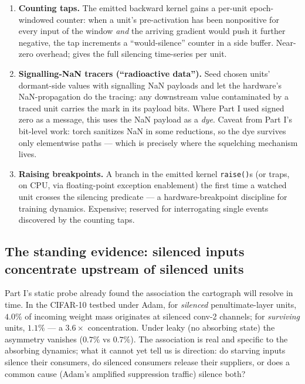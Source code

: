 \documentclass[11pt]{article}
\begin{document}
\begin{enumerate}
\item \textbf{Counting taps.} The emitted backward kernel gains a
per-unit epoch-windowed counter: when a unit's pre-activation has
been nonpositive for every input of the window \emph{and} the
arriving gradient would push it further negative, the tap increments
a ``would-silence'' counter in a side buffer. Near-zero overhead;
gives the full silencing time-series per unit.
\item \textbf{Signalling-NaN tracers (``radioactive data'').} Seed
chosen units' dormant-side values with signalling NaN payloads and
let the hardware's NaN-propagation do the tracing: any downstream
value contaminated by a traced unit carries the mark in its payload
bits. Where Part I used signed zero as a message, this uses the
NaN payload as a \emph{dye}. Caveat from Part I's bit-level work:
torch sanitizes NaN in some reductions, so the dye survives only
elementwise paths --- which is precisely where the squelching
mechanism lives.
\item \textbf{Raising breakpoints.} A branch in the emitted kernel
\texttt{raise()}s (or traps, on CPU, via floating-point exception
enablement) the first time a watched unit crosses the silencing
predicate --- a hardware-breakpoint discipline for training dynamics.
Expensive; reserved for interrogating single events discovered by
the counting taps.
\end{enumerate}

\subsection{The standing evidence: silenced inputs concentrate
upstream of silenced units}

Part I's static probe already found the association the cartograph
will resolve in time. In the CIFAR-10 testbed under Adam, for
\emph{silenced} penultimate-layer units, $4.0\%$ of incoming weight
mass originates at silenced conv-2 channels; for \emph{surviving}
units, $1.1\%$ --- a $3.6\times$ concentration. Under leaky (no
absorbing state) the asymmetry vanishes ($0.7\%$ vs $0.7\%$). The
association is real and specific to the absorbing dynamics; what it
cannot yet tell us is direction: do starving inputs silence their
consumers, do silenced consumers release their suppliers, or does a
common cause (Adam's amplified suppression traffic) silence both?
\end{document}
